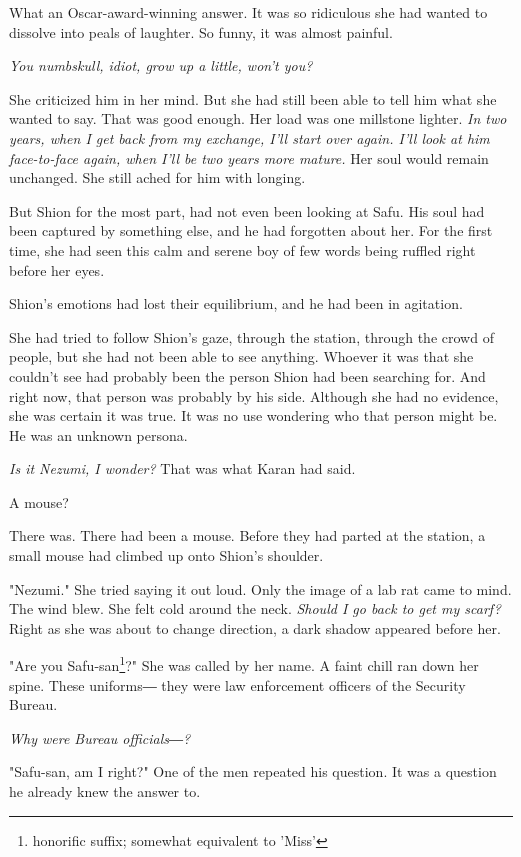 What an Oscar-award-winning answer. It was so ridiculous she had wanted
to dissolve into peals of laughter. So funny, it was almost painful.

\emph{You numbskull, idiot, grow up a little, won't you?}

She criticized him in her mind. But she had still been able to tell him
what she wanted to say. That was good enough. Her load was one millstone
lighter. \emph{In two years, when I get back from my exchange, I'll start over
	again. I'll look at him face-to-face again, when I'll be two years more
	mature.} Her soul would remain unchanged. She still ached for him with
longing.

But Shion for the most part, had not even been looking at Safu. His soul
had been captured by something else, and he had forgotten about her. For
the first time, she had seen this calm and serene boy of few words being
ruffled right before her eyes.

Shion's emotions had lost their equilibrium, and he had been in
agitation.

She had tried to follow Shion's gaze, through the station, through the
crowd of people, but she had not been able to see anything. Whoever it
was that she couldn't see had probably been the person Shion had been
searching for. And right now, that person was probably by his side.
Although she had no evidence, she was certain it was true. It was no use
wondering who that person might be. He was an unknown persona.

\emph{Is it Nezumi, I wonder?} That was what Karan had said.

A mouse?

There was. There had been a mouse. Before they had parted at the
station, a small mouse had climbed up onto Shion's shoulder.

"Nezumi." She tried saying it out loud. Only the image of a lab rat came
to mind. The wind blew. She felt cold around the neck. \emph{Should I go back
	to get my scarf?} Right as she was about to change direction, a dark
shadow appeared before her.

"Are you Safu-san\footnote{honorific suffix; somewhat equivalent to 'Miss'}?" She was called by her name. A faint chill ran down
her spine. These uniforms― they were law enforcement officers of the
Security Bureau.

\emph{Why were Bureau officials―?}

"Safu-san, am I right?" One of the men repeated his question. It was a
question he already knew the answer to.

